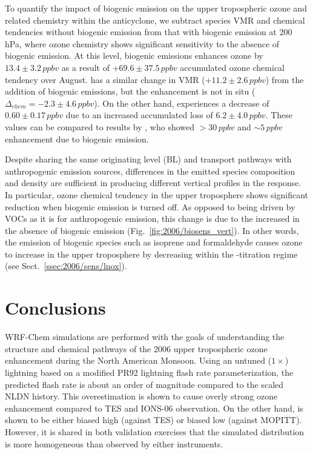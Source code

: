 To quantify the impact of biogenic emission on the upper tropospheric ozone and related chemistry within the anticyclone,
we subtract species VMR and chemical tendencies without biogenic emission from that with biogenic emission at
200\,\unit{hPa}, where ozone chemistry shows significant sensitivity to the absence of biogenic emission. At this level,
biogenic emissions enhances ozone by $13.4\pm3.2\,\unit{ppbv}$ as a result of $+69.6\pm37.5\,\unit{ppbv}$ accumulated
ozone chemical tendency over August.  has a similar change in VMR ($+11.2\pm2.6\,\unit{ppbv}$) from the
addition of biogenic emissions, but the enhancement is not in situ ($\Delta_{chem}=-2.3\pm4.6\,\unit{ppbv}$). On the other
hand,  experiences a decrease of $0.60\pm0.17\,\unit{ppbv}$ due to an increased accumulated loss of
$6.2\pm4.0\,\unit{ppbv}$. These values can be compared to results by \citet{Li:2005ss}, who showed $>30\,\unit{ppbv}$
 and $\sim5\,\unit{ppbv}$  enhancement due to biogenic emission.

Despite sharing the same originating level (BL) and transport pathways with anthropogenic emission sources, differences
in the emitted species composition and density are sufficient in producing different vertical profiles in the response. In
particular, ozone chemical tendency in the upper troposphere shows significant reduction when biogenic emission is
turned off. As opposed to being driven by VOCs as it is for anthropogenic emission, this change is due to the increased
 in the absence of biogenic emission (Fig.~\ref{fig:2006/biosens_vert}). In other words, the emission of
biogenic species such as isoprene and formaldehyde causes ozone to increase in the upper troposphere by decreasing
 within the -titration regime (see Sect.~\ref{ssec:2006/sens/lnox}).


\newpage\section{Conclusions}\label{sec:2006/conslusion}

WRF-Chem simulations are performed with the goals of understanding the structure and chemical pathways of
the 2006 upper tropospheric ozone enhancement during the North American Monsoon. Using an untuned ($1\times$)
lightning based on a modified PR92 lightning flash rate parameterization, the predicted flash rate is about an order
of magnitude compared to the scaled NLDN history. This overestimation is shown to cause overly strong ozone
enhancement compared to TES and IONS-06 observation. On the other hand,  is shown to be either
biased high (against TES) or biased low (against MOPITT). However, it is shared in both validation exercises that
the simulated  distribution is more homogeneous than observed by either instruments.


